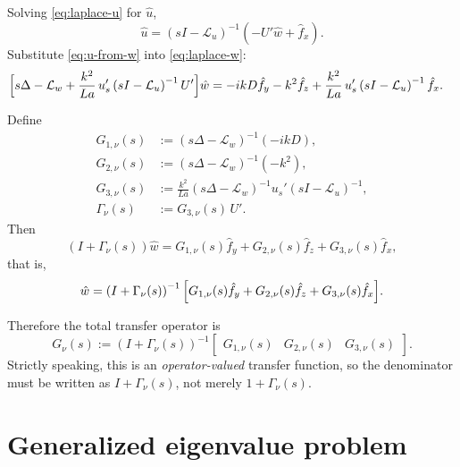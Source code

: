 \documentclass[11pt]{article}
\begin{document}
Solving \eqref{eq:laplace-u} for \(\hat u\),
\begin{equation}
\hat u
=
\left(sI-\mathcal L_u\right)^{-1}
\left(
-U'\hat w + \hat f_x
\right).
\label{eq:u-from-w}
\end{equation}
Substitute \eqref{eq:u-from-w} into \eqref{eq:laplace-w}:
\begin{align}
\Bigl[
s\Delta-\mathcal L_w
+\frac{k^2}{La}\,u_s'
\left(sI-\mathcal L_u\right)^{-1}U'
\Bigr]\hat w
&=
-ikD\hat f_y
-k^2\hat f_z
+\frac{k^2}{La}\,u_s'
\left(sI-\mathcal L_u\right)^{-1}\hat f_x.
\label{eq:w-operator-form}
\end{align}

Define
\begin{subequations}
\begin{align}
G_{1,\nu}(s)
&:=
\left(s\Delta-\mathcal L_w\right)^{-1}(-ikD),
\label{eq:G1}
\\
G_{2,\nu}(s)
&:=
\left(s\Delta-\mathcal L_w\right)^{-1}(-k^2),
\label{eq:G2}
\\
G_{3,\nu}(s)
&:=
\frac{k^2}{La}
\left(s\Delta-\mathcal L_w\right)^{-1}
u_s'
\left(sI-\mathcal L_u\right)^{-1},
\label{eq:G3}
\\
\Gamma_\nu(s)
&:=
G_{3,\nu}(s)\,U'.
\label{eq:Gamma}
\end{align}
\end{subequations}
Then
\begin{equation}
\left(I+\Gamma_\nu(s)\right)\hat w
=
G_{1,\nu}(s)\hat f_y
+G_{2,\nu}(s)\hat f_z
+G_{3,\nu}(s)\hat f_x,
\label{eq:w-transfer-pre}
\end{equation}
that is,
\begin{equation}
\hat w
=
\left(I+\Gamma_\nu(s)\right)^{-1}
\Bigl[
G_{1,\nu}(s)\hat f_y
+G_{2,\nu}(s)\hat f_z
+G_{3,\nu}(s)\hat f_x
\Bigr].
\label{eq:w-transfer-final}
\end{equation}

Therefore the total transfer operator is
\begin{equation}
G_\nu(s)
:=
\left(I+\Gamma_\nu(s)\right)^{-1}
\begin{bmatrix}
G_{1,\nu}(s) & G_{2,\nu}(s) & G_{3,\nu}(s)
\end{bmatrix}.
\label{eq:total-transfer}
\end{equation}
Strictly speaking, this is an \emph{operator-valued} transfer function, so the denominator must be written as \(I+\Gamma_\nu(s)\), not merely \(1+\Gamma_\nu(s)\).

\section{Generalized eigenvalue problem}
\end{document}
